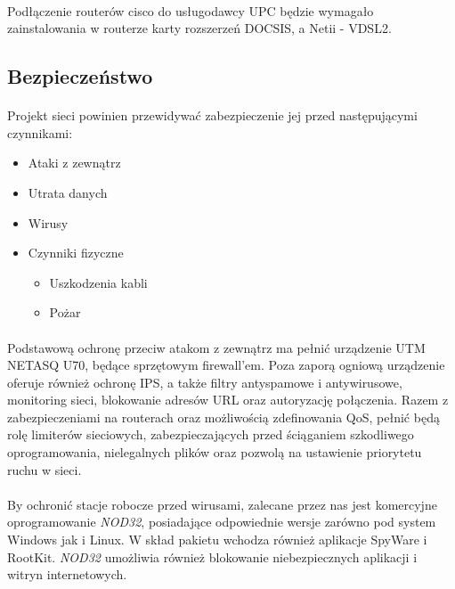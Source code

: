 \paragraph{}
Podłączenie routerów cisco do usługodawcy UPC będzie wymagało zainstalowania w routerze karty rozszerzeń DOCSIS, a Netii - VDSL2. 

\subsection{Bezpieczeństwo}
\paragraph{}
Projekt sieci powinien przewidywać zabezpieczenie jej przed następującymi czynnikami:
\begin{itemize}
	\item Ataki z zewnątrz
	\item Utrata danych
	\item Wirusy
	\item Czynniki fizyczne
	\begin{itemize}
		\item Uszkodzenia kabli
		\item Pożar
	\end{itemize}
\end{itemize}

\paragraph{}
Podstawową ochronę przeciw atakom z zewnątrz ma pełnić urządzenie UTM NETASQ U70, będące sprzętowym firewall'em. Poza zaporą ogniową  urządzenie oferuje również ochronę IPS, a także filtry antyspamowe i antywirusowe, monitoring sieci, blokowanie adresów URL oraz autoryzację połączenia. Razem z zabezpieczeniami na routerach oraz możliwością zdefinowania QoS, pełnić będą rolę limiterów sieciowych, zabezpieczających przed ściąganiem szkodliwego oprogramowania, nielegalnych plików oraz pozwolą na ustawienie priorytetu ruchu w sieci.

\paragraph{}
By ochronić stacje robocze przed wirusami, zalecane przez nas jest komercyjne oprogramowanie \textit{NOD32}, posiadające odpowiednie wersje zarówno pod system Windows jak i Linux. W skład pakietu wchodza również aplikacje SpyWare i RootKit. \textit{NOD32} umożliwia również blokowanie niebezpiecznych aplikacji i witryn internetowych.

